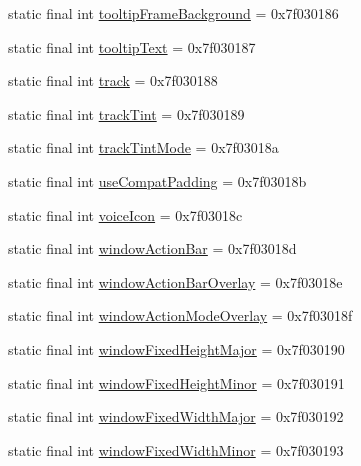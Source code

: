 \begin{DoxyCompactItemize}
static final int \mbox{\hyperlink{classandroid_1_1support_1_1design_1_1R_1_1attr_a098ba3f9d78cf2a09ce24aa2b4bfb1b6}{tooltip\+Frame\+Background}} = 0x7f030186
\item 
static final int \mbox{\hyperlink{classandroid_1_1support_1_1design_1_1R_1_1attr_a9974dd105066b1ce803fda4a5540bc3a}{tooltip\+Text}} = 0x7f030187
\item 
static final int \mbox{\hyperlink{classandroid_1_1support_1_1design_1_1R_1_1attr_a282e2c20f2ebb68f351c47e4b0b76a9a}{track}} = 0x7f030188
\item 
static final int \mbox{\hyperlink{classandroid_1_1support_1_1design_1_1R_1_1attr_abf5a10a01b2bddbdb4e0afa3d567f606}{track\+Tint}} = 0x7f030189
\item 
static final int \mbox{\hyperlink{classandroid_1_1support_1_1design_1_1R_1_1attr_a97828dd1c19f4389956878cac52bee6a}{track\+Tint\+Mode}} = 0x7f03018a
\item 
static final int \mbox{\hyperlink{classandroid_1_1support_1_1design_1_1R_1_1attr_ad72f0347d232271e751f806750bd03ad}{use\+Compat\+Padding}} = 0x7f03018b
\item 
static final int \mbox{\hyperlink{classandroid_1_1support_1_1design_1_1R_1_1attr_ae9f87039b9605fa942ae35a81458ad77}{voice\+Icon}} = 0x7f03018c
\item 
static final int \mbox{\hyperlink{classandroid_1_1support_1_1design_1_1R_1_1attr_aa1af85143de264c6d581a6e6b92a76ea}{window\+Action\+Bar}} = 0x7f03018d
\item 
static final int \mbox{\hyperlink{classandroid_1_1support_1_1design_1_1R_1_1attr_a8ddf882018ee59b96161c242b0c15aa4}{window\+Action\+Bar\+Overlay}} = 0x7f03018e
\item 
static final int \mbox{\hyperlink{classandroid_1_1support_1_1design_1_1R_1_1attr_aceb508b37cba3b18bf90c79342c9132a}{window\+Action\+Mode\+Overlay}} = 0x7f03018f
\item 
static final int \mbox{\hyperlink{classandroid_1_1support_1_1design_1_1R_1_1attr_a116a879901b5c8fd6599597f4d701c91}{window\+Fixed\+Height\+Major}} = 0x7f030190
\item 
static final int \mbox{\hyperlink{classandroid_1_1support_1_1design_1_1R_1_1attr_a0f0ccc630a6cc4c66b09ba8fd1bcf1da}{window\+Fixed\+Height\+Minor}} = 0x7f030191
\item 
static final int \mbox{\hyperlink{classandroid_1_1support_1_1design_1_1R_1_1attr_a5f66d47b3609aef3886dcd603ac63345}{window\+Fixed\+Width\+Major}} = 0x7f030192
\item 
static final int \mbox{\hyperlink{classandroid_1_1support_1_1design_1_1R_1_1attr_a24835259349fddf99fc5c44065de5fb3}{window\+Fixed\+Width\+Minor}} = 0x7f030193

\end{DoxyCompactItemize}
